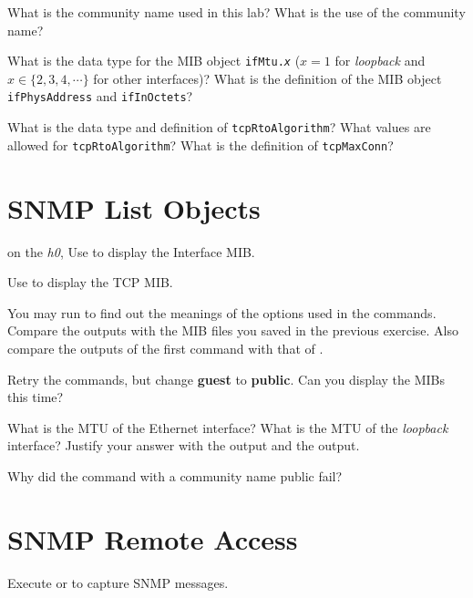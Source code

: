 \documentclass{../UTNetLab}
\begin{document}
    \begin{report}
        \item What is the community name used in this lab? What is the use of the
            community name?
        
        \item What is the data type for the MIB object \texttt{ifMtu.\textit{x}} ($x=1$ for \textit{loopback} and $x \in \{2,3,4,\cdots\}$ for other interfaces)? What is the definition of the MIB object \texttt{ifPhysAddress} and \texttt{ifInOctets}?
        
        \item What is the data type and definition of \texttt{tcpRtoAlgorithm}? What values are allowed for \texttt{tcpRtoAlgorithm}? What is the definition of \texttt{tcpMaxConn}?
    \end{report}

\section{SNMP List Objects}
    on the \textit{h0},
    Use  to display the Interface MIB.

    Use  to display the TCP MIB.

    You may run  to find out the meanings of the options used in the commands.
    Compare the outputs with the MIB files you saved in the previous exercise.
    Also compare the outputs of the first command with that of .

    Retry the  commands, but change \textbf{guest} to \textbf{public}.
    Can you display the MIBs this time?
    
    \begin{report}
        \item What is the MTU of the Ethernet interface? What is the MTU of the \textit{loopback} interface? Justify your answer with the  output and the  output.
        
        \item Why did the  command with a community name public fail?
    \end{report}

\section{SNMP Remote Access}
    Execute  or  to capture SNMP messages.
\end{document}
